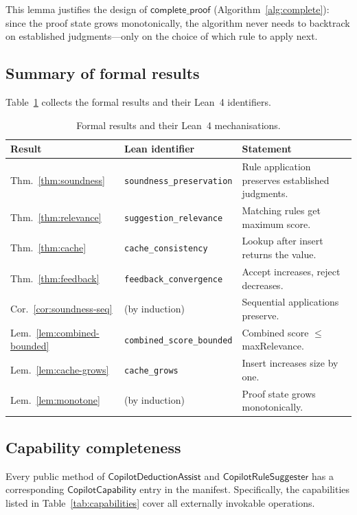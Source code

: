 \documentclass[11pt]{article}
\newcommand{\CDA}{\ensuremath{\mathsf{CopilotDeductionAssist}}}
\newcommand{\CRS}{\ensuremath{\mathsf{CopilotRuleSuggester}}}
\newcommand{\CC}{\ensuremath{\mathsf{CopilotCapability}}}
\newcommand{\completeProof}{\ensuremath{\mathsf{complete\_proof}}}
\begin{document}
\noindent
This lemma justifies the design of $\completeProof$
(Algorithm~\ref{alg:complete}): since the proof state grows
monotonically, the algorithm never needs to backtrack on
established judgments---only on the choice of which rule to apply
next.

\subsection{Summary of formal results}\label{ssec:formal-summary}

Table~\ref{tab:formal} collects the formal results and their
Lean~4 identifiers.

\begin{table}[t]
\centering
\caption{Formal results and their Lean~4 mechanisations.}
\label{tab:formal}
\begin{tabular}{@{}llp{4.2cm}@{}}
\hline
\textbf{Result} & \textbf{Lean identifier} &
  \textbf{Statement} \\
\hline
Thm.~\ref{thm:soundness}
  & \texttt{soundness\_preservation}
  & Rule application preserves established judgments. \\
Thm.~\ref{thm:relevance}
  & \texttt{suggestion\_relevance}
  & Matching rules get maximum score. \\
Thm.~\ref{thm:cache}
  & \texttt{cache\_consistency}
  & Lookup after insert returns the value. \\
Thm.~\ref{thm:feedback}
  & \texttt{feedback\_convergence}
  & Accept increases, reject decreases. \\
Cor.~\ref{cor:soundness-seq}
  & (by induction)
  & Sequential applications preserve. \\
Lem.~\ref{lem:combined-bounded}
  & \texttt{combined\_score\_bounded}
  & Combined score $\leq$ maxRelevance. \\
Lem.~\ref{lem:cache-grows}
  & \texttt{cache\_grows}
  & Insert increases size by one. \\
Lem.~\ref{lem:monotone}
  & (by induction)
  & Proof state grows monotonically. \\
\hline
\end{tabular}
\end{table}

\subsection{Capability completeness}\label{ssec:completeness}

\begin{proposition}\label{prop:complete}
  Every public method of $\CDA$ and $\CRS$ has a corresponding
  $\CC$ entry in the manifest.  Specifically, the
  \ppLXXXVIIcapabilityCount{} capabilities listed in
  Table~\ref{tab:capabilities} cover all externally invokable
  operations.
\end{proposition}
\end{document}
